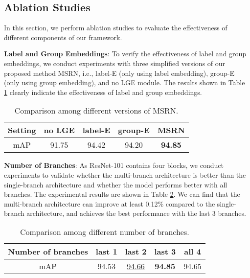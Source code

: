 \documentclass{article} \usepackage{nips14submit_e,times}
\begin{document}
\subsection{Ablation Studies}
In this section, we perform ablation studies to evaluate
the effectiveness of different components of our framework.


\noindent\textbf{Label and Group Embeddings}: To verify the effectiveness of label and group embeddings,
we conduct experiments with three simplified versions of our proposed method MSRN,
i.e., label-E (only using label embedding), group-E (only using group embedding), and no LGE module.
The results shown in Table \ref{table:LGE} clearly indicate the effectiveness of label and group embeddings.
\begin{table}[h]
\caption{Comparison among different versions of MSRN.}
\label{table:LGE}
\centering \small
\begin{tabular}{c|cccc}
\hline
Setting  & no LGE & label-E & group-E & {MSRN}\\ \hline
mAP & 91.75 &94.42 & {94.20} & \textbf{94.85}\\ \hline
\end{tabular}
\end{table}


\noindent\textbf{Number of Branches}: As ResNet-101 contains four blocks, we conduct experiments to
validate whether the multi-branch architecture is better than the single-branch architecture and whether the model performs better with all branches.
The experimental results are shown in Table \ref{tabel:branch}.
We can find that the multi-branch architecture can improve at least 0.12\% compared to the single-branch architecture, and achieves the best performance with the last 3 branches.
\begin{table}[h]
    \caption{Comparison among different number of branches.}
    \label{tabel:branch}
    \centering \small
    \begin{tabular}{c|cccc}
    \hline
        Number of branches & last 1 & last 2 & last 3 & all 4 \\ \hline
        mAP & 94.53 & \underline{94.66} & \textbf{94.85} & 94.65 \\ \hline
    \end{tabular}
\end{table}
\end{document}
